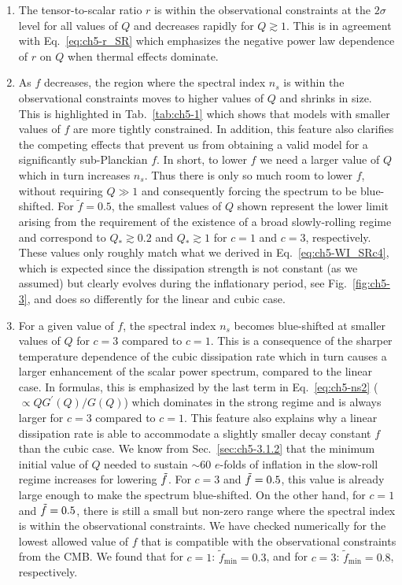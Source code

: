 \begin{enumerate}

    \item The tensor-to-scalar ratio $r$ is within the observational constraints at the $2\sigma$ level for all values of $Q$ and decreases rapidly for $Q\gtrsim 1$. This is in agreement with Eq.~\ref{eq:ch5-r_SR} which emphasizes the negative power law dependence of $r$ on $Q$ when thermal effects dominate.

    \item As $f$ decreases, the region where the spectral index $n_s$ is within the observational constraints moves to higher values of $Q$ and shrinks in size. This is highlighted in Tab.~\ref{tab:ch5-1} which shows that models with smaller values of $f$ are more tightly constrained. In addition, this feature also clarifies the competing effects that prevent us from obtaining a valid model for a significantly sub-Planckian $f$. In short, to lower $f$ we need a larger value of $Q$ which in turn increases $n_s$. Thus there is only so much room to lower $f$, without requiring $Q \gg 1$ and consequently forcing the spectrum to be blue-shifted. For $\tilde{f}=0.5$, the smallest values of $Q$ shown represent the lower limit arising from the requirement of the existence of a broad slowly-rolling regime and correspond to $Q_{*}\gtrsim 0.2$ and $Q_{*}\gtrsim 1$ for $c=1$ and $c=3$, respectively. These values only roughly match what we derived in Eq.~\ref{eq:ch5-WI_SRc4}, which is expected since the dissipation strength is not constant (as we assumed) but clearly evolves during the inflationary period, see Fig.~\ref{fig:ch5-3}, and does so differently for the linear and cubic case.

    \item For a given value of $f$, the spectral index $n_s$ becomes blue-shifted at smaller values of $Q$ for $c=3$ compared to $c=1$. This is a consequence of the sharper temperature dependence of the cubic dissipation rate which in turn causes a larger enhancement of the scalar power spectrum, compared to the linear case. In formulas, this is emphasized by the last term in Eq.~\ref{eq:ch5-ns2} ($\propto Q G^\prime (Q)/G(Q)$) which dominates in the strong regime and is always larger for $c=3$ compared to $c=1$. This feature also explains why a linear dissipation rate is able to accommodate a slightly smaller decay constant $f$ than the cubic case. We know from Sec.~\ref{sec:ch5-3.1.2} that the minimum initial value of $Q$ needed to sustain $\sim 60$ $e$-folds of inflation in the slow-roll regime increases for lowering $\Tilde{f}$. For $c=3$ and $\Tilde{f}=0.5$, this value is already large enough to make the spectrum blue-shifted. On the other hand, for $c=1$ and $\Tilde{f}=0.5$, there is still a small but non-zero range where the spectral index is within the observational constraints. We have checked numerically for the lowest allowed value of $f$ that is compatible with the observational constraints from the CMB. We found that for $c=1$: $\tilde{f}_{\mathrm{min}}=0.3$, and for $c=3$: $\tilde{f}_{\mathrm{min}}=0.8$, respectively.


\end{enumerate}
